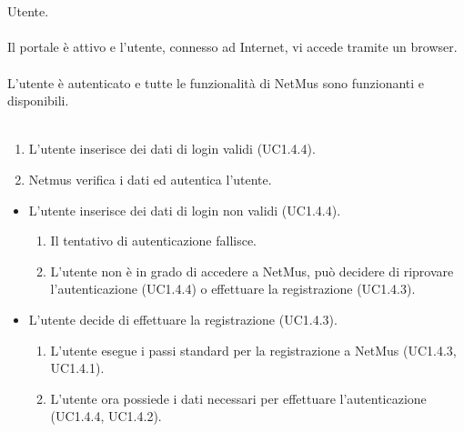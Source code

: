 \vspace{1cm}
\\\\
 Utente. \\\\
 Il portale \`e attivo e l'utente, connesso ad Internet, vi
accede tramite un browser. \\\\
 L'utente \`e autenticato e tutte le funzionalit\`a di
NetMus sono funzionanti e disponibili. \\\\
\begin{enumerate}
  \item L'utente inserisce dei dati di login validi (UC1.4.4).
  \item Netmus verifica i dati ed autentica l'utente.
\end{enumerate}
\begin{itemize}
  \item L'utente inserisce dei dati di login non validi (UC1.4.4).
  \begin {enumerate}
    \item Il tentativo di autenticazione fallisce.
    \item L'utente non \`e in grado di accedere a NetMus, pu\`o decidere di
    riprovare l'autenticazione (UC1.4.4) o effettuare la registrazione
    (UC1.4.3).
  \end{enumerate}
  \item L'utente decide di effettuare la registrazione (UC1.4.3).
  \begin {enumerate}
    \item L'utente esegue i passi standard per la registrazione a NetMus
    (UC1.4.3, UC1.4.1).
    \item L'utente ora possiede i dati necessari per effettuare l'autenticazione (UC1.4.4, UC1.4.2).
  \end{enumerate}
\end{itemize}
\newpage


